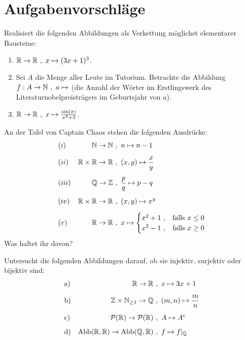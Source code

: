\clearpage
\section{Aufgabenvorschläge}


\begin{aufg}
    Realisiert die folgenden Abbildungen als Verkettung möglichst elementarer Bausteine:
    \begin{enumerate}
        \item $\mathbb R\to \mathbb R \ ,\ x\mapsto (3x+1)^3$.
        \item Sei $A$ die Menge aller Leute im Tutorium. Betrachte die Abbildung $f:A\to \mathbb N \ ,\ a\mapsto$ (die Anzahl der Wörter im Erstlingswerk des Literaturnobelpreisträgers im Geburtsjahr von $a$).
        \item $\mathbb R \to \mathbb R \ ,\ x \mapsto \frac{\sin(x)}{x^2+3}$.
    \end{enumerate}
\end{aufg}


\begin{aufg}[Wohldefiniertheit] \label{aufg:wohldef}
    An der Tafel von Captain Chaos stehen die folgenden Ausdrücke:
    \begin{align*}
        & (i) & \mathbb N \to \mathbb N\ &,\ n \mapsto n-1 \\[0.5em]
        & (ii) & \mathbb R\times \mathbb R \to \mathbb R \ &,\ (x,y) \mapsto \frac{x}{y} \\[0.5em]
        & (iii) & \mathbb Q \to \mathbb Z \ &,\ \frac{p}{q} \mapsto p-q \\[0.5em]
        & (iv) & \mathbb R \times \mathbb R \to \mathbb R \ &,\ (x,y) \mapsto x^y \\[0.5em]
        & (v) & \mathbb R \to \mathbb R \ &,\ x \mapsto \begin{cases}
            x^2+1\ , & \text{falls}\ x \le 0 \\
            x^2-1\ , & \text{falls}\ x\ge 0
        \end{cases}
    \end{align*}
    Was haltet ihr davon?
\end{aufg}


\begin{aufg}
    Untersucht die folgenden Abbildungen darauf, ob sie injektiv, surjektiv oder bijektiv sind:
    \begin{align*}
        & \text{a)} & \mathbb R \to \mathbb R\ &,\ x\mapsto 3x+1 \\[0.5em]
        & \text{b)} & \mathbb Z \times \mathbb N_{\ge 1} \to \mathbb Q\ &,\ (m,n) \mapsto \frac{m}{n} \\[0.5em]
        & \text{c)} & \mathcal P(\mathbb R) \to \mathcal P(\mathbb R) \ &,\ A \mapsto A^c \\[0.5em]
        & \text{d)} & \operatorname{Abb}(\mathbb R,\mathbb R) \to \operatorname{Abb}(\mathbb Q,\mathbb R) \ &,\ f \mapsto f\vert_\mathbb Q
    \end{align*}
\end{aufg}


